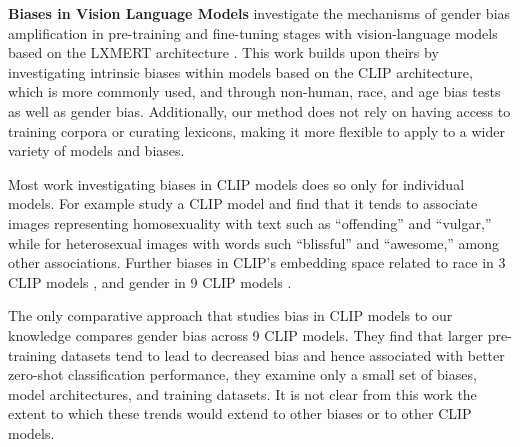\noindent\textbf{Biases in Vision Language Models}
\citet{cabello-etal-2023-evaluating} investigate the mechanisms of gender bias amplification in pre-training and fine-tuning stages with vision-language models based on the LXMERT architecture \cite{tan-bansal-2019-lxmert}. This work builds upon theirs by investigating intrinsic biases within models based on the CLIP architecture, which is more commonly used, and through non-human, race, and age bias tests as well as gender bias. Additionally, our method does not rely on having access to training corpora or curating lexicons, making it more flexible to apply to a wider variety of models and biases.

Most work investigating biases in CLIP models does so only for individual models. For example \citet{Janghorbani2023Multi-ModalModels} study a  CLIP model and find that it tends to associate images representing homosexuality with text such as ``offending'' and ``vulgar,'' while for heterosexual images with words such ``blissful'' and ``awesome,'' among other associations. Further biases in CLIP's embedding space related to race in 3 CLIP models \cite{Wolfe2022MarkednessAI,Wolfe2022EvidenceAI,Wolfe2022AmericanAI}, and gender in 9 CLIP models \cite{Wolfe2023ContrastiveBias}.  

The only comparative approach that studies bias in CLIP models to our knowledge \citet{Berg2022ALearning} compares gender bias across 9 CLIP models. They find that larger pre-training datasets tend to lead to decreased bias and hence associated with better zero-shot classification performance, they examine only a small set of biases, model architectures, and training datasets. It is not clear from this work the extent to which these trends would extend to other biases or to other CLIP models.